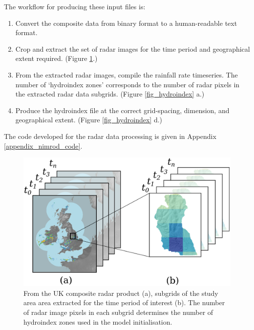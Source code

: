 The workflow for producing these input files is:
\begin{enumerate}
\item Convert the composite data from binary format to a human-readable text format.
\item Crop and extract the set of radar images for the time period and geographical extent required. (Figure \ref{fig_radar_extract}.)
\item From the extracted radar images, compile the rainfall rate timeseries. The number of `hydroindex zones' corresponds to the number of radar pixels in the extracted radar data subgrids. (Figure \ref{fig_hydroindex} a.)
\item Produce the hydroindex file at the correct grid-spacing, dimension, and geographical extent. (Figure \ref{fig_hydroindex} d.)
\end{enumerate}

The code developed for the radar data processing is given in Appendix \ref{appendix_nimrod_code}.

\begin{figure}[htb]
\includegraphics[width=15cm]{chp_radar/cropradar.eps}
\caption{From the UK composite radar product (a), subgrids of the study area area extracted for the time period of interest (b). The number of radar image pixels in each subgrid determines the number of hydroindex zones used in the model initialisation.}
\label{fig_radar_extract}
\end{figure}

